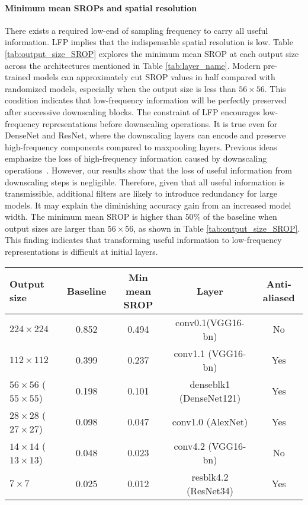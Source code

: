 \documentclass{article}
\begin{document}
\paragraph{Minimum mean SROPs and spatial resolution}
There exists a required low-end of sampling frequency to carry all useful information. LFP implies that the indispensable spatial resolution is low. Table \ref{tab:output_size_SROP} explores the minimum mean SROP at each output size across the architectures mentioned in Table \ref{tab:layer_name}. Modern pre-trained models can approximately cut SROP values in half compared with randomized models, especially when the output size is less than $56\times 56$. This condition indicates that low-frequency information will be perfectly preserved after successive downscaling blocks. The constraint of LFP encourages low-frequency representations before downscaling operations. It is true even for DenseNet and ResNet, where the downscaling layers can encode and preserve high-frequency components compared to maxpooling layers. Previous ideas emphasize the loss of high-frequency information caused by downscaling operations~\cite{LearningIT,make_conv_shift_inva}. However, our results show that the loss of useful information from downscaling steps is negligible. Therefore, given that all useful information is transmissible, additional filters are likely to introduce redundancy for large models. It may explain the diminishing accuracy gain from an increased model width. The minimum mean SROP is higher than $50\%$ of the baseline when output sizes are larger than $56\times 56$, as shown in Table \ref{tab:output_size_SROP}. This finding indicates that transforming useful information to low-frequency representations is difficult at initial layers.
\begin{table*}
    \begin{center}
    \begin{tabular}{l c c c c}
    \hline
    \textbf{Output size} &\textbf{Baseline}& \textbf{Min mean SROP} & \textbf{Layer} & \textbf{Anti-aliased}\\
    \hline
      $224 \times 224$&0.852 &0.494 & conv0.1(VGG16-bn)&No \\
      $112 \times 112$ &0.399&0.237 & conv1.1 (VGG16-bn) &Yes \\
      $56 \times 56$ ($55 \times 55$)&0.198 &0.101&denseblk1 (DenseNet121)&Yes  \\
      $28 \times 28$ ($27 \times 27$)& 0.098 & 0.047  & conv1.0 (AlexNet)&Yes \\
      $14 \times 14$ ($13 \times 13$) &0.048&0.023& conv4.2 (VGG16-bn) &No  \\
      $7 \times 7$ &0.025& 0.012 &resblk4.2 (ResNet34) &Yes\\
      \hline
    \end{tabular}
    \end{center}
    \caption{The minimum mean SROP across model backbones pre-trained on ImageNet at different spatial resolutions. The output sizes of AlexNet feature maps are slight smaller, as displayed in brackets.}
    \label{tab:output_size_SROP}
\end{table*}
\end{document}
